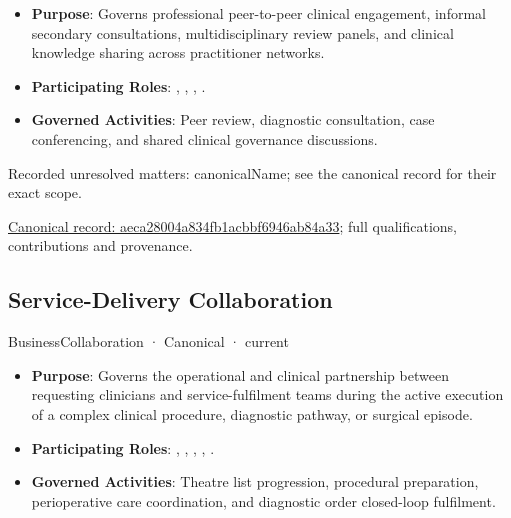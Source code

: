 \begin{itemize}


\item \textbf{Purpose}: Governs professional peer-to-peer clinical engagement, informal secondary consultations, multidisciplinary review panels, and clinical knowledge sharing across practitioner networks.

\item \textbf{Participating Roles}: \texttt{}, \texttt{}, \texttt{}, \texttt{}.

\item \textbf{Governed Activities}: Peer review, diagnostic consultation, case conferencing, and shared clinical governance discussions.

\end{itemize}

{\small Recorded unresolved matters: canonicalName; see the canonical record for their exact scope.}\par
{\footnotesize \href{../../../../continuum/business/business-collaboration/aeca28004a834fb1acbbf6946ab84a33.md}{Canonical record: aeca28004a834fb1acbbf6946ab84a33}; full qualifications, contributions and provenance.}\par
\subsection{Service-Delivery Collaboration}

\label{element:db39b636a6904a50a9225c98b30bc5a9}
{\small BusinessCollaboration · Canonical · current}\par

\begin{itemize}


\item \textbf{Purpose}: Governs the operational and clinical partnership between requesting clinicians and service-fulfilment teams during the active execution of a complex clinical procedure, diagnostic pathway, or surgical episode.

\item \textbf{Participating Roles}: \texttt{}, \texttt{}, \texttt{}, \texttt{}, \texttt{}.

\item \textbf{Governed Activities}: Theatre list progression, procedural preparation, perioperative care coordination, and diagnostic order closed-loop fulfilment.

\end{itemize}

